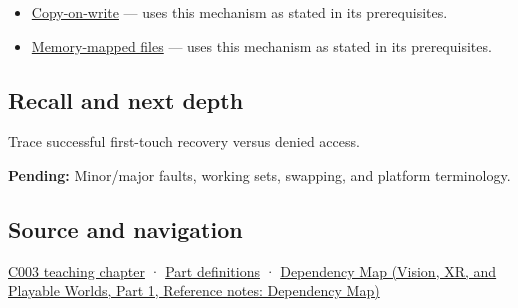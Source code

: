 \begin{itemize}
\tightlist
\item
  \hyperref[appendix-7a06e5baac04]{Copy-on-write} --- uses this mechanism as stated in its prerequisites.
\item
  \hyperref[appendix-313ee7a0ba7b]{Memory-mapped files} --- uses this mechanism as stated in its prerequisites.
\end{itemize}

\subsection{Recall and next depth}\label{appendix-cc0909a7ef14-recall-and-next-depth}

\hypertarget{appendix-cc0909a7ef14-recall-and-next-depth}{}

Trace successful first-touch recovery versus denied access.

\textbf{Pending:} Minor/major faults, working sets, swapping, and platform terminology.

\subsection{Source and navigation}\label{appendix-cc0909a7ef14-source-and-navigation}

\hypertarget{appendix-cc0909a7ef14-source-and-navigation}{}

\hyperref[01-foundations-i-ch002-where-the-bytes-live]{C003 teaching chapter} · \hyperref[appendix-fd090d982a15-m003---parts-41-60]{Part definitions} · \href{../07-Vision-XR-and-Playable-Worlds-P01/main.pdf\#nameddest=appendix-4ad47bdd269a}{Dependency Map (Vision, XR, and Playable Worlds, Part 1, Reference notes: Dependency Map)}
